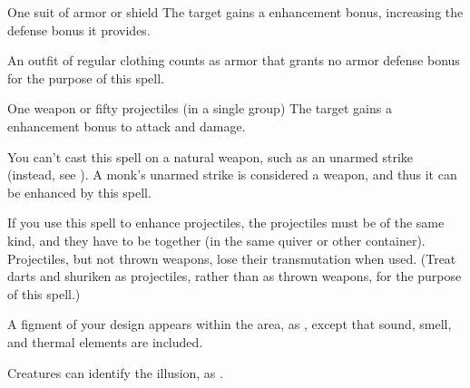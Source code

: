\begin{spellheader}
    \spellrng{\rngclose}
    \spelldur{\durmed}
\end{spellheader}
\begin{spelleffects}
    \begin{spelltarget}{One suit of armor or shield}
        \spelleffect The target gains a  enhancement bonus, increasing the defense bonus it provides. \spellbonusscalingdescription
    \end{spelltarget}
\end{spelleffects}
\begin{spellfooter}
    \spellnotes An outfit of regular clothing counts as armor that grants no armor defense bonus for the purpose of this spell.
\end{spellfooter}

\begin{spellheader}
    \spellrng{\rngclose}
    \spelldur{\durshort}
\end{spellheader}
\begin{spelleffects}
    \begin{spelltarget}{One weapon or fifty projectiles (in a single group)}
        \spelleffect The target gains a  enhancement bonus to attack and damage. \spellbonusscalingdescription
    \end{spelltarget}
\end{spelleffects}
\begin{spellfooter}
    \spellnotes You can't cast this spell on a natural weapon, such as an unarmed strike (instead, see ). A monk's unarmed strike is considered a weapon, and thus it can be enhanced by this spell.
    \par If you use this spell to enhance projectiles, the projectiles must be of the same kind, and they have to be together (in the same quiver or other container). Projectiles, but not thrown weapons, lose their transmutation when used. (Treat darts and shuriken as projectiles, rather than as thrown weapons, for the purpose of this spell.)
\end{spellfooter}

\begin{spellheader}
    \spelldur{\durshort}
\end{spellheader}
\begin{spelleffects}
    \spellline
    \spelleffect A figment of your design appears within the area, as , except that sound, smell, and thermal elements are included.
\end{spelleffects}
\begin{spellfooter}
    \spellnotes Creatures can identify the illusion, as .
\end{spellfooter}

